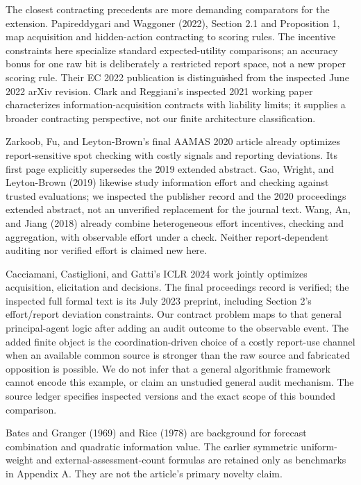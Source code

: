 \documentclass[
  11pt,
]{article}
\begin{document}
The closest contracting precedents are more demanding comparators for
the extension. Papireddygari and Waggoner (2022), Section 2.1 and
Proposition 1, map acquisition and hidden-action contracting to scoring
rules. The incentive constraints here specialize standard
expected-utility comparisons; an accuracy bonus for one raw bit is
deliberately a restricted report space, not a new proper scoring rule.
Their EC 2022 publication is distinguished from the inspected June 2022
arXiv revision. Clark and Reggiani's inspected 2021 working paper
characterizes information-acquisition contracts with liability limits;
it supplies a broader contracting perspective, not our finite
architecture classification.

Zarkoob, Fu, and Leyton-Brown's final AAMAS 2020 article already
optimizes report-sensitive spot checking with costly signals and
reporting deviations. Its first page explicitly supersedes the 2019
extended abstract. Gao, Wright, and Leyton-Brown (2019) likewise study
information effort and checking against trusted evaluations; we
inspected the publisher record and the 2020 proceedings extended
abstract, not an unverified replacement for the journal text. Wang, An,
and Jiang (2018) already combine heterogeneous effort incentives,
checking and aggregation, with observable effort under a check. Neither
report-dependent auditing nor verified effort is claimed new here.

Cacciamani, Castiglioni, and Gatti's ICLR 2024 work jointly optimizes
acquisition, elicitation and decisions. The final proceedings record is
verified; the inspected full formal text is its July 2023 preprint,
including Section 2's effort/report deviation constraints. Our contract
problem maps to that general principal-agent logic after adding an audit
outcome to the observable event. The added finite object is the
coordination-driven choice of a costly report-use channel when an
available common source is stronger than the raw source and fabricated
opposition is possible. We do not infer that a general algorithmic
framework cannot encode this example, or claim an unstudied general
audit mechanism. The source ledger specifies inspected versions and the
exact scope of this bounded comparison.

Bates and Granger (1969) and Rice (1978) are background for forecast
combination and quadratic information value. The earlier symmetric
uniform-weight and external-assessment-count formulas are retained only
as benchmarks in Appendix A. They are not the article's primary novelty
claim.
\end{document}
